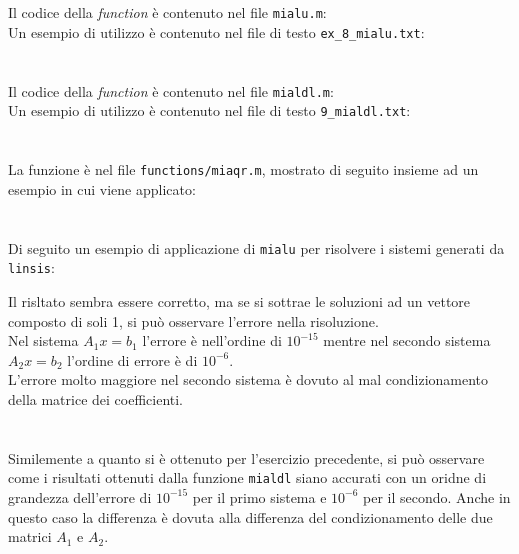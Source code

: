 \documentclass[10pt,a4paper]{article}
\begin{document}
\section{}
Il codice della \textit{function} è contenuto nel file \texttt{mialu.m}:\\
Un esempio di utilizzo è contenuto nel file di testo \texttt{ex\_8\_mialu.txt}:

\section{}
Il codice della \textit{function} è contenuto nel file \texttt{mialdl.m}:\\
Un esempio di utilizzo è contenuto nel file di testo \texttt{9\_mialdl.txt}:
\section{}
La funzione è nel file \texttt{functions/miaqr.m}, mostrato di seguito insieme ad un esempio in cui viene applicato:
\\


\pagebreak
\section{}
Di seguito un esempio di applicazione di \texttt{mialu} per risolvere i sistemi generati da \texttt{linsis}:

Il risltato sembra essere corretto, ma se si sottrae le soluzioni ad un vettore composto di soli 1, si può osservare l'errore nella risoluzione.\\
Nel sistema $A_1x=b_1$ l'errore è nell'ordine di $10^{-15}$ mentre nel secondo sistema $A_2x=b_2$ l'ordine di errore è di $10^{-6}$.\\
L'errore molto maggiore nel secondo sistema è dovuto al mal condizionamento della matrice dei coefficienti.

\section{}
Similemente a quanto si è ottenuto per l'esercizio precedente, si può osservare come i risultati ottenuti dalla funzione \texttt{mialdl} siano accurati con un oridne di grandezza dell'errore di $10^{-15}$ per il primo sistema e $10^{-6}$ per il secondo. Anche in questo caso la differenza è dovuta alla differenza del condizionamento delle due matrici $A_1$ e $A_2$.

\end{document}
